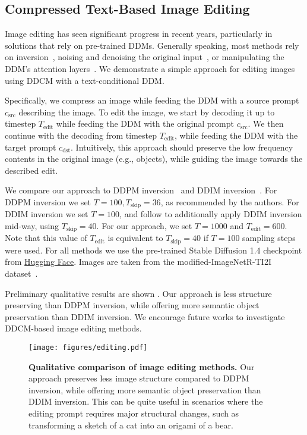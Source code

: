 \subsection{Compressed Text-Based Image Editing}\label{app:editing}

Image editing has seen significant progress in recent years, particularly in solutions that rely on pre-trained DDMs.
Generally speaking, most methods rely on inversion~\citep{huberman2024edit,manor2024zeroshot,wu2023latent,wallace2023edict,hertz2023delta}, noising and denoising the original input~\citep{meng2022sdedit}, or manipulating the DDM's attention layers~\citep{hertz2023prompttoprompt,tumanyan2023plug}.
We demonstrate a simple approach for editing images using DDCM with a text-conditional DDM. 

Specifically, we compress an image while feeding the DDM with a source prompt $c_{\text{src}}$ describing the image.
To edit the image, we start by decoding it up to timestep $T_\text{edit}$ while feeding the DDM with the original prompt $c_{\text{src}}$.
We then continue with the decoding from timestep $T_\text{edit}$, while feeding the DDM with the target prompt $c_{\text{dst}}$.
Intuitively, this approach should preserve the low frequency contents in the original image (e.g., objects), while guiding the image towards the described edit.

We compare our approach to DDPM inversion~\citep{huberman2024edit} and DDIM inversion~\citep{song2021denoising}. 
For DDPM inversion we set $T=100, T_\text{skip}=36$, as recommended by the authors. For DDIM inversion we set $T=100$, and follow \citet{huberman2024edit} to additionally apply DDIM inversion mid-way, using $T_\text{skip}=40$.
For our approach, we set $T=1000$ and $T_\text{edit}=600$. Note that this value of $T_\text{edit}$ is equivalent to $T_\text{skip}=40$ if $T=100$ sampling steps were used. 
For all methods we use the pre-trained Stable Diffusion 1.4 checkpoint from \href{https://huggingface.co/CompVis/stable-diffusion-v1-4}{Hugging Face}. Images are taken from the modified-ImageNetR-TI2I dataset~\citep{huberman2024edit, tumanyan2023plug}.

Preliminary qualitative results are shown .
Our approach is less structure preserving than DDPM inversion, while offering more semantic object preservation than DDIM inversion. 
We encourage future works to investigate DDCM-based image editing methods.

\begin{figure}
    \centering
    \texttt{[image: figures/editing.pdf]}
    \caption{\textbf{Qualitative comparison of image editing methods.} Our approach preserves less image structure compared to DDPM inversion, while offering more semantic object preservation than DDIM inversion. This can be quite useful in scenarios where the editing prompt requires major structural changes, such as transforming a sketch of a cat into an origami of a bear.}
    \label{fig:editing}
\end{figure}
